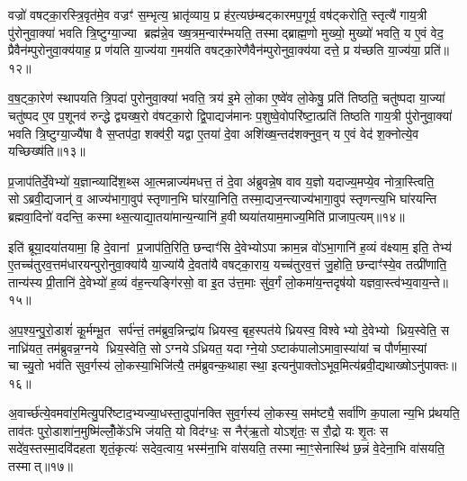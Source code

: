 वज्रो॑ वषट्का॒रस्त्रि॒वृत॑मे॒व वज्रꣳ॑ स॒म्भृत्य॒ भ्रातृ॑व्याय॒ प्र ह॑र॒त्यछ॑म्बट्कारमप॒गूर्य॒ वष॑ट्करोति॒ स्तृत्यै॑ गाय॒त्री पु॑रोनुवा॒क्या॑ भवति त्रि॒ष्टुग्या॒ज्या ब्रह्म॑न्ने॒व ख्ष॒त्रम॒न्वार॑म्भयति॒ तस्माद्ब्राह्म॒णो मुख्यो॒ मुख्यो॑ भवति॒ य ए॒वं वेद॒ प्रैवैन॑म्पुरोनुवा॒क्य॑याह॒ प्र ण॑यति या॒ज्य॑या ग॒मय॑ति वषट्का॒रेणैवैन॑म्पुरोनुवा॒क्य॑या दत्ते॒ प्र य॑च्छति या॒ज्य॑या॒ प्रति॑॥१२॥

व॒ष॒ट्का॒रेण॑ स्थापयति त्रि॒पदा॑ पुरोनुवा॒क्या॑ भवति॒ त्रय॑ इ॒मे लो॒का ए॒ष्वे॑व लो॒केषु॒ प्रति॑ तिष्ठति॒ चतु॑ष्पदा या॒ज्या॑ चतु॑ष्पद ए॒व प॒शूनव॑ रुन्द्धे द्व्यख्ष॒रो व॑षट्का॒रो द्वि॒पाद्यज॑मानः प॒शुष्वे॒वोपरि॑ष्टा॒त्प्रति॑ तिष्ठति गाय॒त्री पु॑रोनुवा॒क्या॑ भवति त्रि॒ष्टुग्या॒ज्यै॑षा वै स॒प्तप॑दा॒ शक्व॑री॒ यद्वा ए॒तया॑ दे॒वा अशि॑ख्ष॒न्तद॑शक्नुव॒न् य ए॒वं वेद॑ श॒क्नोत्ये॒व यच्छिख्ष॑ति॥१३॥

{\anuvakamend[{दे॒वता॑नाङ्करोत्यु॒परि॑ष्टाल्ल॒क्ष्माऽऽज्य॑भागौ॒ प्रति॑ श॒क्नोत्ये॒व द्वे च॑॥२॥}]}

प्र॒जाप॑तिर्दे॒वेभ्यो॑ य॒ज्ञान्व्यादि॑श॒थ्स आ॒त्मन्नाज्य॑मधत्त॒ तं दे॒वा अ॑ब्रुवन्ने॒ष वाव य॒ज्ञो यदाज्य॒मप्ये॒व नोत्रा॒स्त्विति॒ सोऽब्रवी॒द्यजान्॑ व॒ आज्य॑भागा॒वुप॑ स्तृणान॒भि घा॑रया॒निति॒ तस्मा॒द्यज॒न्त्याज्य॑भागा॒वुप॑ स्तृणन्त्य॒भि घा॑रयन्ति ब्रह्मवा॒दिनो॑ वदन्ति॒ कस्माथ्स॒त्याद्या॒तया॑मान्य॒न्यानि॑ ह॒वीष्यया॑तयाम॒माज्य॒मिति॑ प्राजाप॒त्यम्॥१४॥

इति॑ ब्रूया॒दया॑तयामा॒ हि दे॒वानां प्र॒जाप॑ति॒रिति॒ छन्दाꣳ॑सि दे॒वेभ्योऽपाक्राम॒न्न वो॑ऽभा॒गानि॑ ह॒व्यं व॑क्ष्याम॒ इति॒ तेभ्य॑ ए॒तच्च॑तुरव॒त्तम॑धारयन्पुरोनुवा॒क्या॑यै या॒ज्या॑यै दे॒वता॑यै वषट्का॒राय॒ यच्च॑तुरव॒त्तं जु॒होति॒ छन्दाꣳ॑स्ये॒व तत्प्री॑णाति॒ तान्य॑स्य प्री॒तानि॑ दे॒वेभ्यो॑ ह॒व्यं व॑ह॒न्त्यङ्गि॑रसो॒ वा इ॒त उ॑त्त॒माः सु॑व॒र्गं लो॒कमा॑य॒न्तदृष॑यो यज्ञवा॒स्त्व॑भ्य॒वाय॒न्ते॥१५॥

अ॒प॒श्य॒न्पु॒रो॒डाशं॑ कू॒र्मम्भू॒त सर्प॑न्तं॒ तम॑ब्रुव॒न्निन्द्रा॑य ध्रियस्व॒ बृह॒स्पत॑ये ध्रियस्व॒ विश्वेभ्यो दे॒वेभ्यो ध्रिय॒स्वेति॒ स नाध्रि॑यत॒ तम॑ब्रुवन्न॒ग्नये ध्रिय॒स्वेति॒ सोऽग्नयेऽध्रियत॒ यदाग्ने॒योऽष्टाक॑पालोऽमावा॒स्या॑यां च पौर्णमा॒स्यां चाच्यु॒तो भव॑ति सुव॒र्गस्य॑ लो॒कस्या॒भिजि॑त्यै॒ तम॑ब्रुवन्क॒थाहास्था॒ इत्यनु॑पाक्तोऽभूव॒मित्य॑ब्रवी॒द्यथाख्षोऽनु॑पाक्तः॥१६॥

अ॒वार्च्छ॑त्ये॒वमवा॑र॒मित्यु॒परि॑ष्टाद॒भ्यज्या॒धस्ता॒दुपा॑नक्ति सुव॒र्गस्य॑ लो॒कस्य॒ सम॑ष्ट्यै॒ सर्वा॑णि क॒पालान्य॒भि प्र॑थयति॒ ताव॑तः पुरो॒डाशा॑न॒मुष्मि॑ल्लोँ॒के॑ऽभि ज॑यति॒ यो विद॑ग्धः॒ स नैर्\mbox{}॑ऋ॒तो योऽशृ॑तः॒ स रौ॒द्रो यः शृ॒तः स सदे॑व॒स्तस्मा॒दवि॑दहता शृतं॒कृत्यः॑ सदेव॒त्वाय॒ भस्म॑ना॒भि वा॑सयति॒ तस्मान्मा॒ꣳ॒सेनास्थि॑ छ॒न्नं वे॒देना॒भि वा॑सयति॒ तस्मात्॥१७॥

